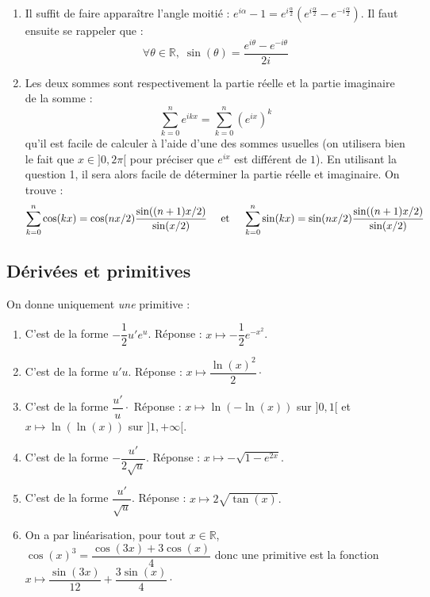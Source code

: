 \documentclass[a4paper,twoside,french,11pt]{VcCours}
\begin{document}
\begin{enumerate}
\item Il suffit de faire apparaître l'angle moitié : $e^{i \alpha}-1 = e^{i \frac{\alpha}{2}} (e^{i \frac{\alpha}{2}} - e^{-i \frac{\alpha}{2}})$. Il faut ensuite se rappeler que :
$$ \forall \theta \in \mathbb{R}, \; \sin(\theta) = \dfrac{e^{i \theta}-e^{-i \theta}}{2i}$$
\item Les deux sommes sont respectivement la partie réelle et la partie imaginaire de la somme :
$$ \sum_{k=0}^n e^{ikx} = \sum_{k=0}^n (e^{ix})^k$$
qu'il est facile de calculer à l'aide d'une des sommes usuelles (on utilisera bien le fait que $x \in ]0, 2\pi [$ pour préciser que $e^{ix}$ est différent de $1$). En utilisant la question 1, il sera alors facile de déterminer la partie réelle et imaginaire. On trouve : 
$$ \sum_{k=0}^n \cos(kx) = \cos(n x /2) \frac{\sin((n+1)x/2)}{\sin(x/2)} \quad \hbox{ et } \quad \sum_{k=0}^n \sin(kx) = \sin(n x /2) \frac{\sin((n+1)x/2)}{\sin(x/2)}$$
\end{enumerate}



\subsection{Dérivées et primitives}

%
%

\begin{Exercice}{}\end{Exercice}On donne uniquement \textit{une} primitive : 

\begin{enumerate}
\item C'est de la forme $ - \dfrac{1}{2} u'e^u$. Réponse : $x \mapsto - \dfrac{1}{2} e^{-x^2}$.
\item C'est de la forme $ u'u$. Réponse : $x \mapsto \dfrac{\ln(x)^2}{2} \cdot$
\item C'est de la forme $\dfrac{u'}{u}\cdot$ Réponse : $x \mapsto \ln( -\ln(x) )$ sur $]0,1[$ et $x \mapsto \ln( \ln(x) )$ sur $]1, + \infty[$.
\item C'est de la forme $ -\dfrac{u'}{2\sqrt{u}}$. Réponse : $x \mapsto - \sqrt{1-e^{2x}}.$
\item C'est de la forme $ \dfrac{u'}{\sqrt{u}}$. Réponse : $x \mapsto 2 \sqrt{\tan(x)}.$
\item On a par linéarisation, pour tout $x \in \mathbb{R}$, $\cos(x)^3 = \dfrac{\cos(3x)+3\cos(x)}{4}$ donc une primitive est la fonction $x \mapsto \dfrac{\sin(3x)}{12} + \dfrac{3\sin(x)}{4}\cdot$
\end{enumerate}
\end{document}
